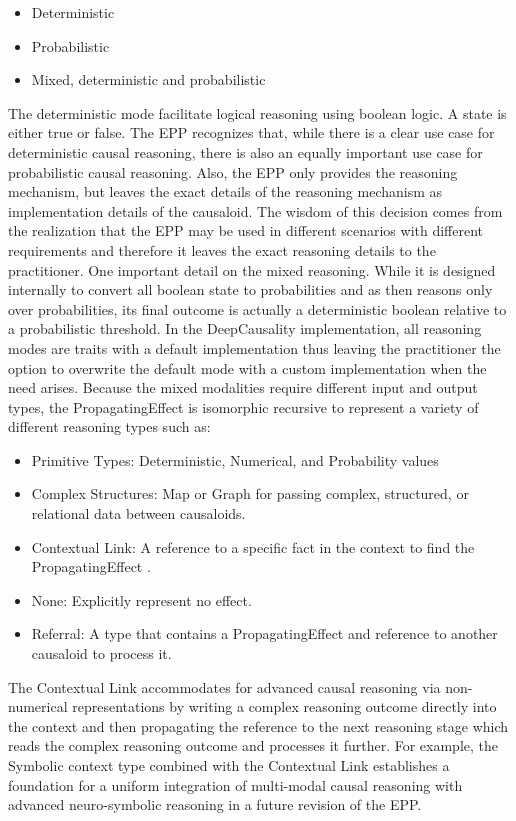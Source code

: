 \begin{itemize}	
	\item Deterministic
	\item Probabilistic 
	\item Mixed, deterministic and probabilistic 
\end{itemize}

The deterministic mode facilitate logical reasoning using boolean logic. A state is either true or false. The EPP recognizes that, while there is a clear use case for deterministic causal reasoning, there is also an equally important use case for probabilistic causal reasoning. Also, the EPP only provides the reasoning mechanism, but leaves the exact details of the reasoning mechanism as implementation details of the causaloid. The wisdom of this decision comes from the realization that the EPP may be used in different scenarios with different requirements and therefore it leaves the exact reasoning details to the practitioner. One important detail on the mixed reasoning. While it is designed internally to convert all boolean state to probabilities and as then reasons only over  probabilities, its final outcome is actually a deterministic boolean relative to a probabilistic threshold. In the DeepCausality implementation, all reasoning modes are traits with a default implementation thus leaving the practitioner the option to overwrite the default mode with a custom implementation when the need arises. Because the mixed modalities require different input and output types, the PropagatingEffect is isomorphic recursive to represent a variety of different reasoning types such as:

\begin{itemize}	
	\item Primitive Types: Deterministic, Numerical, and Probability values
	\item Complex Structures: Map or Graph for passing complex, structured, or relational data between causaloids.
	\item Contextual Link: A reference to a specific fact in the context to find the PropagatingEffect . 
	\item None: Explicitly represent no effect.
	\item Referral: A type that contains a PropagatingEffect and reference to another causaloid to process it.
\end{itemize}

The Contextual Link accommodates for advanced causal reasoning via non-numerical representations by writing a complex reasoning outcome directly into the context and then propagating the reference to the next reasoning stage which reads the complex reasoning outcome and processes it further. For example, the Symbolic context type combined with the Contextual Link establishes a foundation for a uniform integration of multi-modal causal reasoning with advanced neuro-symbolic reasoning in a future revision of the EPP.

